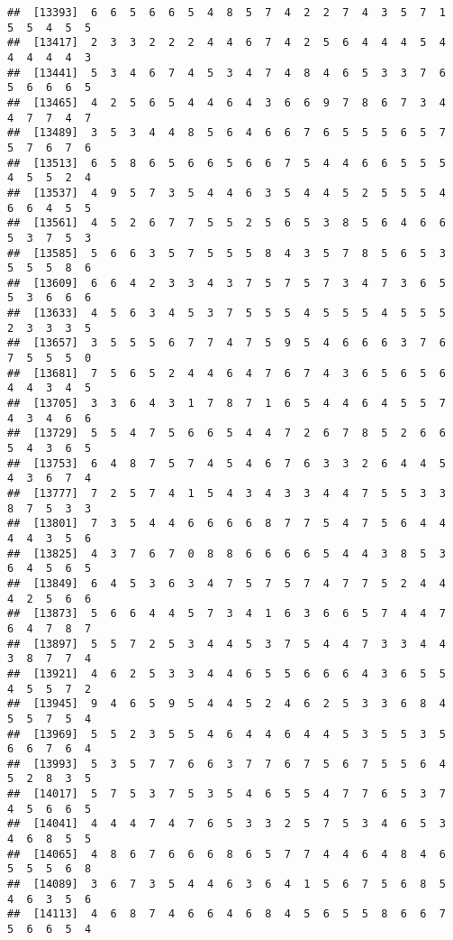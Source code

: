 \documentclass[
]{book}
\begin{document}
\begin{verbatim}
##  [13393]  6  6  5  6  6  5  4  8  5  7  4  2  2  7  4  3  5  7  1  5  5  4  5  5
##  [13417]  2  3  3  2  2  2  4  4  6  7  4  2  5  6  4  4  4  5  4  4  4  4  4  3
##  [13441]  5  3  4  6  7  4  5  3  4  7  4  8  4  6  5  3  3  7  6  5  6  6  6  5
##  [13465]  4  2  5  6  5  4  4  6  4  3  6  6  9  7  8  6  7  3  4  4  7  7  4  7
##  [13489]  3  5  3  4  4  8  5  6  4  6  6  7  6  5  5  5  6  5  7  5  7  6  7  6
##  [13513]  6  5  8  6  5  6  6  5  6  6  7  5  4  4  6  6  5  5  5  4  5  5  2  4
##  [13537]  4  9  5  7  3  5  4  4  6  3  5  4  4  5  2  5  5  5  4  6  6  4  5  5
##  [13561]  4  5  2  6  7  7  5  5  2  5  6  5  3  8  5  6  4  6  6  5  3  7  5  3
##  [13585]  5  6  6  3  5  7  5  5  5  8  4  3  5  7  8  5  6  5  3  5  5  5  8  6
##  [13609]  6  6  4  2  3  3  4  3  7  5  7  5  7  3  4  7  3  6  5  5  3  6  6  6
##  [13633]  4  5  6  3  4  5  3  7  5  5  5  4  5  5  5  4  5  5  5  2  3  3  3  5
##  [13657]  3  5  5  5  6  7  7  4  7  5  9  5  4  6  6  6  3  7  6  7  5  5  5  0
##  [13681]  7  5  6  5  2  4  4  6  4  7  6  7  4  3  6  5  6  5  6  4  4  3  4  5
##  [13705]  3  3  6  4  3  1  7  8  7  1  6  5  4  4  6  4  5  5  7  4  3  4  6  6
##  [13729]  5  5  4  7  5  6  6  5  4  4  7  2  6  7  8  5  2  6  6  5  4  3  6  5
##  [13753]  6  4  8  7  5  7  4  5  4  6  7  6  3  3  2  6  4  4  5  4  3  6  7  4
##  [13777]  7  2  5  7  4  1  5  4  3  4  3  3  4  4  7  5  5  3  3  8  7  5  3  3
##  [13801]  7  3  5  4  4  6  6  6  6  8  7  7  5  4  7  5  6  4  4  4  4  3  5  6
##  [13825]  4  3  7  6  7  0  8  8  6  6  6  6  5  4  4  3  8  5  3  6  4  5  6  5
##  [13849]  6  4  5  3  6  3  4  7  5  7  5  7  4  7  7  5  2  4  4  4  2  5  6  6
##  [13873]  5  6  6  4  4  5  7  3  4  1  6  3  6  6  5  7  4  4  7  6  4  7  8  7
##  [13897]  5  5  7  2  5  3  4  4  5  3  7  5  4  4  7  3  3  4  4  3  8  7  7  4
##  [13921]  4  6  2  5  3  3  4  4  6  5  5  6  6  6  4  3  6  5  5  4  5  5  7  2
##  [13945]  9  4  6  5  9  5  4  4  5  2  4  6  2  5  3  3  6  8  4  5  5  7  5  4
##  [13969]  5  5  2  3  5  5  4  6  4  4  6  4  4  5  3  5  5  3  5  6  6  7  6  4
##  [13993]  5  3  5  7  7  6  6  3  7  7  6  7  5  6  7  5  5  6  4  5  2  8  3  5
##  [14017]  5  7  5  3  7  5  3  5  4  6  5  5  4  7  7  6  5  3  7  4  5  6  6  5
##  [14041]  4  4  4  7  4  7  6  5  3  3  2  5  7  5  3  4  6  5  3  4  6  8  5  5
##  [14065]  4  8  6  7  6  6  6  8  6  5  7  7  4  4  6  4  8  4  6  5  5  5  6  8
##  [14089]  3  6  7  3  5  4  4  6  3  6  4  1  5  6  7  5  6  8  5  4  6  3  5  6
##  [14113]  4  6  8  7  4  6  6  4  6  8  4  5  6  5  5  8  6  6  7  5  6  6  5  4

\end{verbatim}
\end{document}
